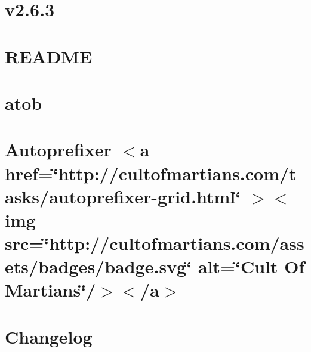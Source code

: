 \documentclass[twoside]{book}
\newcommand{\+}{\discretionary{\mbox{\scriptsize$\hookleftarrow$}}{}{}}
\begin{document}
\chapter{v2.6.3}
\label{md__c___users_vaishnavi_jadhav__desktop__developer_code_mean_stack_example_client_node_modules_async__c_h_a_n_g_e_l_o_g}

\chapter{README}
\label{md__c___users_vaishnavi_jadhav__desktop__developer_code_mean_stack_example_client_node_modules_async__r_e_a_d_m_e}

\chapter{atob}
\label{md__c___users_vaishnavi_jadhav__desktop__developer_code_mean_stack_example_client_node_modules_atob__r_e_a_d_m_e}

\chapter{Autoprefixer \texorpdfstring{$<$}{<}a href=\char`\"{}http\+://cultofmartians.\+com/tasks/autoprefixer-\/grid.\+html\char`\"{} \texorpdfstring{$>$}{>}\texorpdfstring{$<$}{<}img src=\char`\"{}http\+://cultofmartians.\+com/assets/badges/badge.\+svg\char`\"{} alt=\char`\"{}\+Cult Of Martians\char`\"{}/\texorpdfstring{$>$}{>}\texorpdfstring{$<$}{<}/a\texorpdfstring{$>$}{>}}
\label{md__c___users_vaishnavi_jadhav__desktop__developer_code_mean_stack_example_client_node_modules_autoprefixer__r_e_a_d_m_e}

\chapter{Changelog}
\label{md__c___users_vaishnavi_jadhav__desktop__developer_code_mean_stack_example_client_node_modules_babel_loader__c_h_a_n_g_e_l_o_g}

\end{document}
